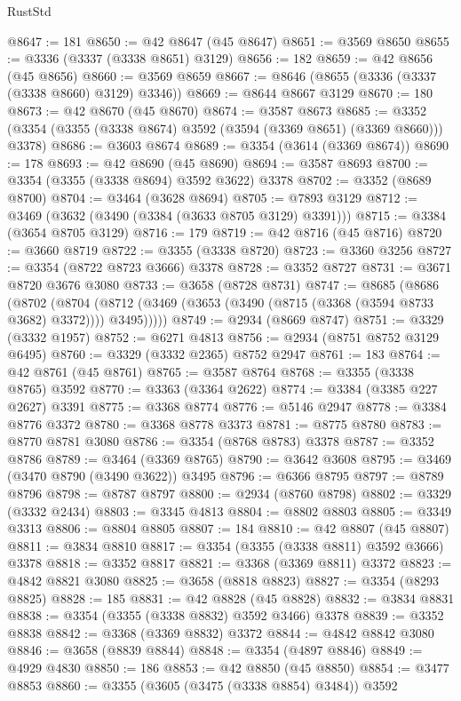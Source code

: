 \begin{lexlean}{RustStd}
\begin{coremodule}
@8647 := 181
@8650 := @42 @8647 (@45 @8647)
@8651 := @3569 @8650
@8655 := @3336 (@3337 (@3338 @8651) @3129)
@8656 := 182
@8659 := @42 @8656 (@45 @8656)
@8660 := @3569 @8659
@8667 := @8646 (@8655 (@3336 (@3337 (@3338 @8660) @3129) @3346))
@8669 := @8644 @8667 @3129
@8670 := 180
@8673 := @42 @8670 (@45 @8670)
@8674 := @3587 @8673
@8685 := @3352 (@3354 (@3355 (@3338 @8674) @3592 (@3594 (@3369 @8651) (@3369 @8660))) @3378)
@8686 := @3603 @8674
@8689 := @3354 (@3614 (@3369 @8674))
@8690 := 178
@8693 := @42 @8690 (@45 @8690)
@8694 := @3587 @8693
@8700 := @3354 (@3355 (@3338 @8694) @3592 @3622) @3378
@8702 := @3352 (@8689 @8700)
@8704 := @3464 (@3628 @8694)
@8705 := @7893 @3129
@8712 := @3469 (@3632 (@3490 (@3384 (@3633 @8705 @3129) @3391)))
@8715 := @3384 (@3654 @8705 @3129)
@8716 := 179
@8719 := @42 @8716 (@45 @8716)
@8720 := @3660 @8719
@8722 := @3355 (@3338 @8720)
@8723 := @3360 @3256
@8727 := @3354 (@8722 @8723 @3666) @3378
@8728 := @3352 @8727
@8731 := @3671 @8720 @3676 @3080
@8733 := @3658 (@8728 @8731)
@8747 := @8685
    (@8686
      (@8702
        (@8704 (@8712 (@3469 (@3653 (@3490 (@8715 (@3368 (@3594 @8733 @3682) @3372)))) @3495)))))
@8749 := @2934 (@8669 @8747)
@8751 := @3329 (@3332 @1957)
@8752 := @6271 @4813
@8756 := @2934 (@8751 @8752 @3129 @6495)
@8760 := @3329 (@3332 @2365) @8752 @2947
@8761 := 183
@8764 := @42 @8761 (@45 @8761)
@8765 := @3587 @8764
@8768 := @3355 (@3338 @8765) @3592
@8770 := @3363 (@3364 @2622)
@8774 := @3384 (@3385 @227 @2627) @3391
@8775 := @3368 @8774
@8776 := @5146 @2947
@8778 := @3384 @8776 @3372
@8780 := @3368 @8778 @3373
@8781 := @8775 @8780
@8783 := @8770 @8781 @3080
@8786 := @3354 (@8768 @8783) @3378
@8787 := @3352 @8786
@8789 := @3464 (@3369 @8765)
@8790 := @3642 @3608
@8795 := @3469 (@3470 @8790 (@3490 @3622)) @3495
@8796 := @6366 @8795
@8797 := @8789 @8796
@8798 := @8787 @8797
@8800 := @2934 (@8760 @8798)
@8802 := @3329 (@3332 @2434)
@8803 := @3345 @4813
@8804 := @8802 @8803
@8805 := @3349 @3313
@8806 := @8804 @8805
@8807 := 184
@8810 := @42 @8807 (@45 @8807)
@8811 := @3834 @8810
@8817 := @3354 (@3355 (@3338 @8811) @3592 @3666) @3378
@8818 := @3352 @8817
@8821 := @3368 (@3369 @8811) @3372
@8823 := @4842 @8821 @3080
@8825 := @3658 (@8818 @8823)
@8827 := @3354 (@8293 @8825)
@8828 := 185
@8831 := @42 @8828 (@45 @8828)
@8832 := @3834 @8831
@8838 := @3354 (@3355 (@3338 @8832) @3592 @3466) @3378
@8839 := @3352 @8838
@8842 := @3368 (@3369 @8832) @3372
@8844 := @4842 @8842 @3080
@8846 := @3658 (@8839 @8844)
@8848 := @3354 (@4897 @8846)
@8849 := @4929 @4830
@8850 := 186
@8853 := @42 @8850 (@45 @8850)
@8854 := @3477 @8853
@8860 := @3355 (@3605 (@3475 (@3338 @8854) @3484)) @3592

\end{coremodule}
\end{lexlean}
